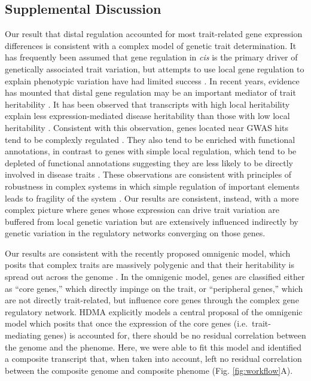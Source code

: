 \documentclass[
]{article}
\begin{document}
\subsection{Supplemental Discussion}\label{supplemental-discussion}

Our result that distal regulation accounted for most trait-related gene
expression differences is consistent with a complex model of genetic
trait determination. It has frequently been assumed that gene regulation
in \textit{cis} is the primary driver of genetically associated trait
variation, but attempts to use local gene regulation to explain
phenotypic variation have had limited success
\cite{pmid32912663, pmid36515579}. In recent years, evidence has mounted
that distal gene regulation may be an important mediator of trait
heritability \cite{pmid32424349, 
pmid37857933, pmid31051098}. It has been observed that transcripts with
high local heritability explain less expression-mediated disease
heritability than those with low local heritability \cite{pmid32424349}.
Consistent with this observation, genes located near GWAS hits tend to
be complexly regulated \cite{pmid37857933}. They also tend to be
enriched with functional annotations, in contrast to genes with simple
local regulation, which tend to be depleted of functional annotations
suggesting they are less likely to be directly involved in disease
traits \cite{pmid37857933}. These observations are consistent with
principles of robustness in complex systems in which simple regulation
of important elements leads to fragility of the system
\cite{pmid29782925, pmid12082173, pmid27304973}. Our results are
consistent, instead, with a more complex picture where genes whose
expression can drive trait variation are buffered from local genetic
variation but are extensively influenced indirectly by genetic variation
in the regulatory networks converging on those genes.

Our results are consistent with the recently proposed omnigenic model,
which posits that complex traits are massively polygenic and that their
heritability is spread out across the genome \cite{pmid28622505}. In the
omnigenic model, genes are classified either as ``core genes,'' which
directly impinge on the trait, or ``peripheral genes,'' which are not
directly trait-related, but influence core genes through the complex
gene regulatory network. HDMA explicitly models a central proposal of
the omnigenic model which posits that once the expression of the core
genes (i.e.~trait-mediating genes) is accounted for, there should be no
residual correlation between the genome and the phenome. Here, we were
able to fit this model and identified a composite transcript that, when
taken into account, left no residual correlation between the composite
genome and composite phenome (Fig. \ref{fig:workflow}A).
\end{document}

